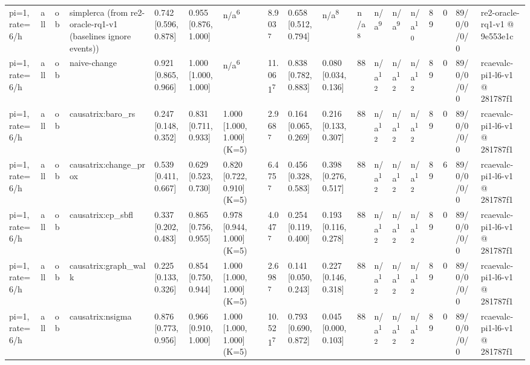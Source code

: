 \begin{table}[t]
\begin{tabular}{llllllllllllllllll}
pi=1, rate=6/h & all & ob & simplerca (from re2-oracle-rq1-v1 (baselines ignore events)) & 0.742 [0.596, 0.878] & 0.955 [0.876, 1.000] & n/a\textsuperscript{6} & 8.903\textsuperscript{7} & 0.658 [0.512, 0.794] & n/a\textsuperscript{8} & n/a\textsuperscript{8} & n/a\textsuperscript{9} & n/a\textsuperscript{9} & n/a\textsuperscript{10} & 89 & 0 & 89/0/0/0/0 & re2-oracle-rq1-v1 @ 9e553e1c \\
pi=1, rate=6/h & all & ob & naive-change & 0.921 [0.865, 0.966] & 1.000 [1.000, 1.000] & n/a\textsuperscript{6} & 11.061\textsuperscript{7} & 0.838 [0.782, 0.883] & 0.080 [0.034, 0.136] & 88 & n/a\textsuperscript{12} & n/a\textsuperscript{12} & n/a\textsuperscript{12} & 89 & 0 & 89/0/0/0/0 & rcaevalc-pi1-l6-v1 @ 281787f1 \\
pi=1, rate=6/h & all & ob & causatrix:baro\_rs & 0.247 [0.148, 0.352] & 0.831 [0.711, 0.933] & 1.000 [1.000, 1.000] (K=5) & 2.968\textsuperscript{7} & 0.164 [0.065, 0.269] & 0.216 [0.133, 0.307] & 88 & n/a\textsuperscript{12} & n/a\textsuperscript{12} & n/a\textsuperscript{12} & 89 & 0 & 89/0/0/0/0 & rcaevalc-pi1-l6-v1 @ 281787f1 \\
pi=1, rate=6/h & all & ob & causatrix:change\_prox & 0.539 [0.411, 0.667] & 0.629 [0.523, 0.730] & 0.820 [0.722, 0.910] (K=5) & 6.475\textsuperscript{7} & 0.456 [0.328, 0.583] & 0.398 [0.276, 0.517] & 88 & n/a\textsuperscript{12} & n/a\textsuperscript{12} & n/a\textsuperscript{12} & 89 & 6 & 89/0/0/0/0 & rcaevalc-pi1-l6-v1 @ 281787f1 \\
pi=1, rate=6/h & all & ob & causatrix:cp\_sbfl & 0.337 [0.202, 0.483] & 0.865 [0.756, 0.955] & 0.978 [0.944, 1.000] (K=5) & 4.047\textsuperscript{7} & 0.254 [0.119, 0.400] & 0.193 [0.116, 0.278] & 88 & n/a\textsuperscript{12} & n/a\textsuperscript{12} & n/a\textsuperscript{12} & 89 & 0 & 89/0/0/0/0 & rcaevalc-pi1-l6-v1 @ 281787f1 \\
pi=1, rate=6/h & all & ob & causatrix:graph\_walk & 0.225 [0.133, 0.326] & 0.854 [0.750, 0.944] & 1.000 [1.000, 1.000] (K=5) & 2.698\textsuperscript{7} & 0.141 [0.050, 0.243] & 0.227 [0.146, 0.318] & 88 & n/a\textsuperscript{12} & n/a\textsuperscript{12} & n/a\textsuperscript{12} & 89 & 0 & 89/0/0/0/0 & rcaevalc-pi1-l6-v1 @ 281787f1 \\
pi=1, rate=6/h & all & ob & causatrix:nsigma & 0.876 [0.773, 0.956] & 0.966 [0.910, 1.000] & 1.000 [1.000, 1.000] (K=5) & 10.521\textsuperscript{7} & 0.793 [0.690, 0.872] & 0.045 [0.000, 0.103] & 88 & n/a\textsuperscript{12} & n/a\textsuperscript{12} & n/a\textsuperscript{12} & 89 & 0 & 89/0/0/0/0 & rcaevalc-pi1-l6-v1 @ 281787f1 \\

\end{tabular}
\end{table}
